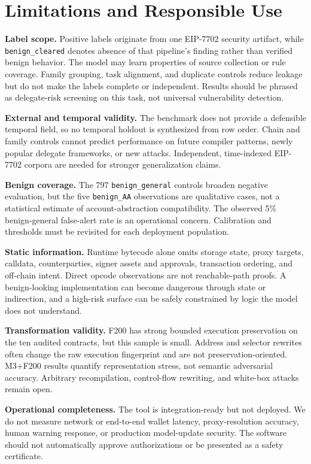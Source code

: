 \documentclass[conference]{IEEEtran}
\newcommand{\bclear}{\texttt{benign\_cleared}}
\newcommand{\bgen}{\texttt{benign\_general}}
\newcommand{\baa}{\texttt{benign\_AA}}
\begin{document}
\section{Limitations and Responsible Use}
\label{sec:limitations}

\textbf{Label scope.} Positive labels originate from one EIP-7702 security artifact, while
\bclear{} denotes absence of that pipeline's finding rather than verified benign behavior. The
model may learn properties of source collection or rule coverage. Family grouping, task
alignment, and duplicate controls reduce leakage but do not make the labels complete or
independent. Results should be phrased as delegate-risk screening on this task, not universal
vulnerability detection.

\textbf{External and temporal validity.} The benchmark does not provide a defensible temporal
field, so no temporal holdout is synthesized from row order. Chain and family controls cannot
predict performance on future compiler patterns, newly popular delegate frameworks, or new
attacks. Independent, time-indexed EIP-7702 corpora are needed for stronger generalization claims.

\textbf{Benign coverage.} The 797 \bgen{} controls broaden negative evaluation, but the five
\baa{} observations are qualitative cases, not a statistical estimate of account-abstraction
compatibility. The observed 5\% benign-general false-alert rate is an operational concern.
Calibration and thresholds must be revisited for each deployment population.

\textbf{Static information.} Runtime bytecode alone omits storage state, proxy targets, calldata,
counterparties, signer assets and approvals, transaction ordering, and off-chain intent. Direct
opcode observations are not reachable-path proofs. A benign-looking implementation can become
dangerous through state or indirection, and a high-risk surface can be safely constrained by
logic the model does not understand.

\textbf{Transformation validity.} F200 has strong bounded execution preservation on the ten
audited contracts, but this sample is small. Address and selector rewrites often change the raw
execution fingerprint and are not preservation-oriented. M3+F200 results quantify representation
stress, not semantic adversarial accuracy. Arbitrary recompilation, control-flow rewriting, and
white-box attacks remain open.

\textbf{Operational completeness.} The tool is integration-ready but not deployed. We do not
measure network or end-to-end wallet latency, proxy-resolution accuracy, human warning response,
or production model-update security. The software should not automatically approve
authorizations or be presented as a safety certificate.
\end{document}

